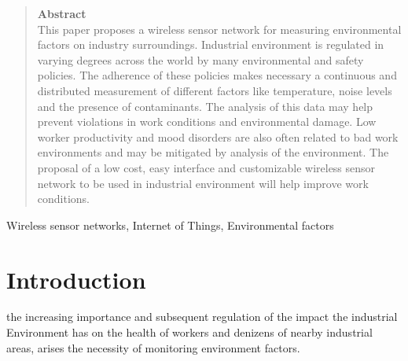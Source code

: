\documentclass[letterpaper]{IEEEtran}
\begin{document}
\maketitle
\begin{abstract}
\noindent \textbf{Abstract}\\
This paper proposes a wireless sensor network for measuring environmental factors on industry surroundings.
Industrial environment is regulated in varying degrees across the world by many environmental and safety policies.
The adherence of these policies makes necessary a continuous and distributed measurement of different factors like temperature, noise levels and the presence of contaminants.
The analysis of this data may help prevent violations in work conditions and environmental damage. Low worker productivity and mood disorders are also often related to bad work environments and may be mitigated by analysis of the environment.
The proposal of a low cost, easy interface and customizable wireless sensor network to be used in industrial environment will help improve work conditions.
\end{abstract}

\begin{IEEEkeywords}
Wireless sensor networks, Internet of Things, Environmental factors
\end{IEEEkeywords}





%
\IEEEpeerreviewmaketitle



\section{Introduction}
%
%
%
%
 the increasing importance and subsequent regulation of the impact the industrial Environment has on the health of workers and denizens of nearby industrial areas, arises the necessity of monitoring environment factors.
\end{document}
